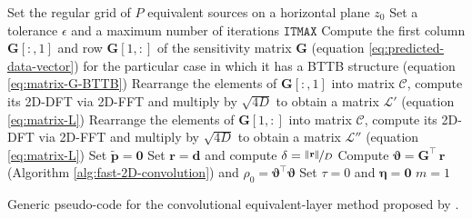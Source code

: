 \documentclass[utf8]{FrontiersinHarvard} %
\begin{document}
	\begin{algorithm}
		\Input{}
		Set the regular grid of $P$ equivalent sources on a horizontal plane $z_{0}$ \;
		Set a tolerance $\epsilon$ and a maximum number of iterations $\mathtt{ITMAX}$ \;
		Compute the first column $\mathbf{G}[:,1]$ and row $\mathbf{G}[1,:]$ of the sensitivity matrix $\mathbf{G}$ (equation \ref{eq:predicted-data-vector}) 
		for the particular case in which it has a BTTB structure (equation \ref{eq:matrix-G-BTTB})\;
		Rearrange the elements of $\mathbf{G}[:,1]$ into matrix $\boldsymbol{\mathcal{C}}$, compute 
		its 2D-DFT via 2D-FFT and multiply by $\sqrt{4D}$ to obtain a matrix $\boldsymbol{\mathcal{L}}'$ (equation \ref{eq:matrix-L})\;
		Rearrange the elements of $\mathbf{G}[1,:]$ into matrix $\boldsymbol{\mathcal{C}}$, compute 
		its 2D-DFT via 2D-FFT and multiply by $\sqrt{4D}$ to obtain a matrix $\boldsymbol{\mathcal{L}}''$ (equation \ref{eq:matrix-L})\;
		Set $\tilde{\mathbf{p}} = \mathbf{0}$ \;
		Set $\mathbf{r} = \mathbf{d}$ and compute $\delta = \nicefrac{\| \mathbf{r} \|}{D}$ \;
		Compute $\boldsymbol{\vartheta} = \mathbf{G}^{\top} \, \mathbf{r}$ (Algorithm \ref{alg:fast-2D-convolution}) and $\rho_{0} = \boldsymbol{\vartheta}^{\top} \boldsymbol{\vartheta}$ \;
		Set $\tau = 0$ and $\boldsymbol{\eta} = \mathbf{0}$ \;
		$m = 1$ \;
		\caption{Generic pseudo-code for the convolutional equivalent-layer method proposed by 
			\citet{takahashi-etal2020,takahashi-etal2022}.}
		\label{alg:TOB20-22}
	\end{algorithm}
	
\end{document}
